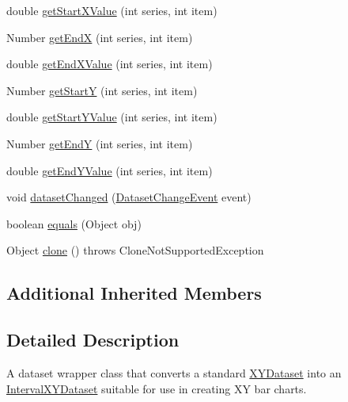 \begin{DoxyCompactItemize}
\item 
double \mbox{\hyperlink{classorg_1_1jfree_1_1data_1_1xy_1_1_x_y_bar_dataset_aa9cfc4276ea7952e5907d0584ff541c4}{get\+Start\+X\+Value}} (int series, int item)
\item 
Number \mbox{\hyperlink{classorg_1_1jfree_1_1data_1_1xy_1_1_x_y_bar_dataset_a8cbbb2473a1aa92d02cbb097d18e3f9e}{get\+EndX}} (int series, int item)
\item 
double \mbox{\hyperlink{classorg_1_1jfree_1_1data_1_1xy_1_1_x_y_bar_dataset_af131ec7a0e1416df72f14cee94fe8cd0}{get\+End\+X\+Value}} (int series, int item)
\item 
Number \mbox{\hyperlink{classorg_1_1jfree_1_1data_1_1xy_1_1_x_y_bar_dataset_a73d9f2c262f9bc9025b4325873394a09}{get\+StartY}} (int series, int item)
\item 
double \mbox{\hyperlink{classorg_1_1jfree_1_1data_1_1xy_1_1_x_y_bar_dataset_acecbf0eedd803245aa43c76e0937fb6c}{get\+Start\+Y\+Value}} (int series, int item)
\item 
Number \mbox{\hyperlink{classorg_1_1jfree_1_1data_1_1xy_1_1_x_y_bar_dataset_a35b633397a23d1e009bca8b35fb3d4d8}{get\+EndY}} (int series, int item)
\item 
double \mbox{\hyperlink{classorg_1_1jfree_1_1data_1_1xy_1_1_x_y_bar_dataset_a0d37cd7bac49afb6555e23d7d1ef1868}{get\+End\+Y\+Value}} (int series, int item)
\item 
void \mbox{\hyperlink{classorg_1_1jfree_1_1data_1_1xy_1_1_x_y_bar_dataset_afb40c3c8580e0a88758707acb30d5d17}{dataset\+Changed}} (\mbox{\hyperlink{classorg_1_1jfree_1_1data_1_1general_1_1_dataset_change_event}{Dataset\+Change\+Event}} event)
\item 
boolean \mbox{\hyperlink{classorg_1_1jfree_1_1data_1_1xy_1_1_x_y_bar_dataset_a080cfcd285437d37656effb3bc4e948d}{equals}} (Object obj)
\item 
Object \mbox{\hyperlink{classorg_1_1jfree_1_1data_1_1xy_1_1_x_y_bar_dataset_a4121f402c60d912cc2778814c0a74b3f}{clone}} ()  throws Clone\+Not\+Supported\+Exception 
\end{DoxyCompactItemize}
\subsection*{Additional Inherited Members}


\subsection{Detailed Description}
A dataset wrapper class that converts a standard \mbox{\hyperlink{interfaceorg_1_1jfree_1_1data_1_1xy_1_1_x_y_dataset}{X\+Y\+Dataset}} into an \mbox{\hyperlink{interfaceorg_1_1jfree_1_1data_1_1xy_1_1_interval_x_y_dataset}{Interval\+X\+Y\+Dataset}} suitable for use in creating XY bar charts. 

